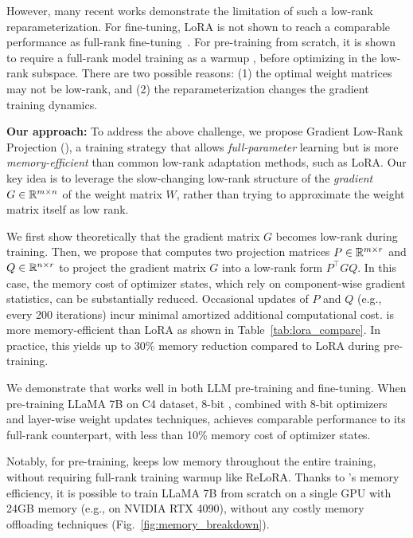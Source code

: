 However, many recent works demonstrate the limitation of such a low-rank reparameterization. For fine-tuning, LoRA is not shown to reach a comparable performance as full-rank fine-tuning~\cite{xiaChainLoRAEfficient2024}.
For pre-training from scratch, it is shown to require a full-rank model training as a warmup \citep{lialinReLoRAHighRankTraining2023}, before optimizing in the low-rank subspace. There are two possible reasons: (1) the optimal weight matrices may not be low-rank, and (2) the reparameterization changes the gradient training dynamics.

{\bf Our approach: }To address the above challenge, we propose Gradient Low-Rank Projection (\textbf{\lowrank}), a training strategy that allows \emph{full-parameter} learning but is more \emph{memory-efficient} than common low-rank adaptation methods, such as LoRA. Our key idea is to leverage the slow-changing low-rank structure of the \emph{gradient} $G\in\mathbb{R}^{m\times n}$ of the weight matrix $W$, rather than trying to approximate the weight matrix itself as low rank. 

We first show theoretically that the gradient matrix $G$ becomes low-rank during training. Then, we propose \lowrank{} that computes two projection matrices $P\in \mathbb{R}^{m\times r}$ and $Q\in \mathbb{R}^{n\times r}$ to project the gradient matrix $G$ into a low-rank form $P^\top G Q$.
In this case, the memory cost of optimizer states, which rely on component-wise gradient statistics, can be substantially reduced. Occasional updates of $P$ and $Q$ (e.g., every 200 iterations) incur minimal amortized additional computational cost.
\lowrank is more memory-efficient than LoRA as shown in Table~\ref{tab:lora_compare}.
In practice, this yields up to 30\% memory reduction compared to LoRA during pre-training.




We demonstrate that \lowrank{} works well in both LLM pre-training and fine-tuning. When pre-training LLaMA 7B on C4 dataset, 8-bit \lowrank, combined with 8-bit optimizers and layer-wise weight updates techniques, achieves comparable performance to its full-rank counterpart, with less than 10\% memory cost of optimizer states. 

Notably, for pre-training, \lowrank{} keeps low memory throughout the entire training, without requiring full-rank training warmup like ReLoRA.  
Thanks to \lowrank's memory efficiency, it is possible to train LLaMA 7B from scratch on a single GPU with 24GB memory (e.g., on NVIDIA RTX 4090), without any costly memory offloading techniques (Fig.~\ref{fig:memory_breakdown}).

